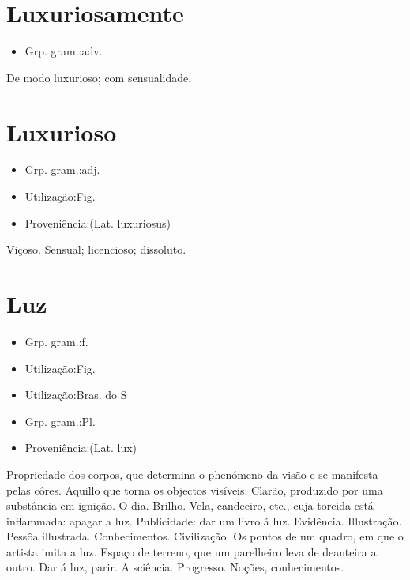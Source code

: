 \section{Luxuriosamente}
\begin{itemize}
\item {Grp. gram.:adv.}
\end{itemize}
De modo luxurioso; com sensualidade.
\section{Luxurioso}
\begin{itemize}
\item {Grp. gram.:adj.}
\end{itemize}
\begin{itemize}
\item {Utilização:Fig.}
\end{itemize}
\begin{itemize}
\item {Proveniência:(Lat. \textunderscore luxuriosus\textunderscore )}
\end{itemize}
Viçoso.
Sensual; licencioso; dissoluto.
\section{Luz}
\begin{itemize}
\item {Grp. gram.:f.}
\end{itemize}
\begin{itemize}
\item {Utilização:Fig.}
\end{itemize}
\begin{itemize}
\item {Utilização:Bras. do S}
\end{itemize}
\begin{itemize}
\item {Grp. gram.:Pl.}
\end{itemize}
\begin{itemize}
\item {Proveniência:(Lat. \textunderscore lux\textunderscore )}
\end{itemize}
Propriedade dos corpos, que determina o phenómeno da visão e se manifesta pelas côres.
Aquillo que torna os objectos visíveis.
Clarão, produzido por uma substância em ignição.
O dia.
Brilho.
Vela, candeeiro, etc., cuja torcida está inflammada: \textunderscore apagar a luz\textunderscore .
Publicidade: \textunderscore dar um livro á luz\textunderscore .
Evidência.
Illustração.
Pessôa illustrada.
Conhecimentos.
Civilização.
Os pontos de um quadro, em que o artista imita a luz.
Espaço de terreno, que um parelheiro leva de deanteira a outro.
\textunderscore Dar á luz\textunderscore , parir.
A sciência.
Progresso.
Noções, conhecimentos.
